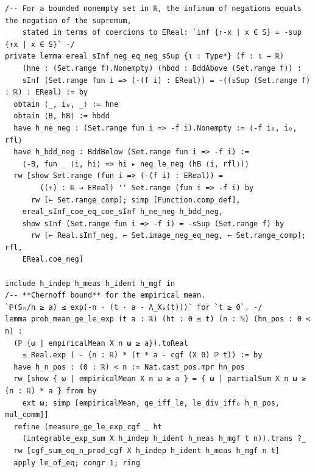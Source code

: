 \newpage
\begin{lstlisting}
/-- For a bounded nonempty set in ℝ, the infimum of negations equals the negation of the supremum,
    stated in terms of coercions to EReal: `inf {↑-x | x ∈ S} = -sup {↑x | x ∈ S}` -/
private lemma ereal_sInf_neg_eq_neg_sSup {ι : Type*} (f : ι → ℝ)
    (hne : (Set.range f).Nonempty) (hbdd : BddAbove (Set.range f)) :
    sInf (Set.range fun i => (-(f i) : EReal)) = -((sSup (Set.range f) : ℝ) : EReal) := by
  obtain ⟨_, i₀, _⟩ := hne
  obtain ⟨B, hB⟩ := hbdd
  have h_ne_neg : (Set.range fun i => -f i).Nonempty := ⟨-f i₀, i₀, rfl⟩
  have h_bdd_neg : BddBelow (Set.range fun i => -f i) :=
    ⟨-B, fun _ ⟨i, hi⟩ => hi ▸ neg_le_neg (hB ⟨i, rfl⟩)⟩
  rw [show Set.range (fun i => (-(f i) : EReal)) =
        ((↑) : ℝ → EReal) '' Set.range (fun i => -f i) by
      rw [← Set.range_comp]; simp [Function.comp_def],
    ereal_sInf_coe_eq_coe_sInf h_ne_neg h_bdd_neg,
    show sInf (Set.range fun i => -f i) = -sSup (Set.range f) by
      rw [← Real.sInf_neg, ← Set.image_neg_eq_neg, ← Set.range_comp]; rfl,
    EReal.coe_neg]

include h_indep h_meas h_ident h_mgf in
/-- **Chernoff bound** for the empirical mean.
`ℙ(Sₙ/n ≥ a) ≤ exp(-n · (t · a - Λ_X₀(t)))` for `t ≥ 0`. -/
lemma prob_mean_ge_le_exp (t a : ℝ) (ht : 0 ≤ t) (n : ℕ) (hn_pos : 0 < n) :
  (ℙ {ω | empiricalMean X n ω ≥ a}).toReal
    ≤ Real.exp ( - (n : ℝ) * (t * a - cgf (X 0) ℙ t)) := by
  have h_n_pos : (0 : ℝ) < n := Nat.cast_pos.mpr hn_pos
  rw [show { ω | empiricalMean X n ω ≥ a } = { ω | partialSum X n ω ≥ (n : ℝ) * a } from by
    ext ω; simp [empiricalMean, ge_iff_le, le_div_iff₀ h_n_pos, mul_comm]]
  refine (measure_ge_le_exp_cgf _ ht
    (integrable_exp_sum X h_indep h_ident h_meas h_mgf t n)).trans ?_
  rw [cgf_sum_eq_n_prod_cgf X h_indep h_ident h_meas h_mgf n t]
  apply le_of_eq; congr 1; ring
\end{lstlisting}
\newpage
